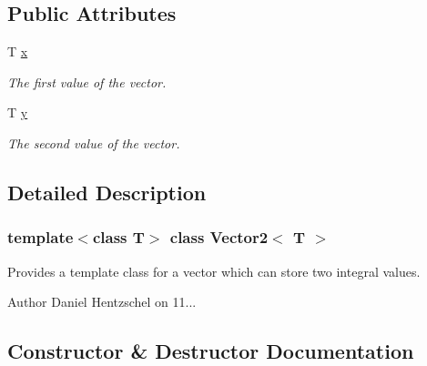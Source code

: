 \subsection*{Public Attributes}
\begin{DoxyCompactItemize}
\item 
\mbox{\label{class_vector2_a78fa1f2ed5e261c7fbeb8f3536a1ee34}} 
T \mbox{\hyperlink{class_vector2_a78fa1f2ed5e261c7fbeb8f3536a1ee34}{x}}
\begin{DoxyCompactList}\small\item\em The first value of the vector. \end{DoxyCompactList}\item 
\mbox{\label{class_vector2_a6cfed8355591aa269f4dba43bd806ef9}} 
T \mbox{\hyperlink{class_vector2_a6cfed8355591aa269f4dba43bd806ef9}{y}}
\begin{DoxyCompactList}\small\item\em The second value of the vector. \end{DoxyCompactList}\end{DoxyCompactItemize}


\subsection{Detailed Description}
\subsubsection*{template$<$class T$>$\newline
class Vector2$<$ T $>$}

Provides a template class for a vector which can store two integral values. 

\begin{DoxyAuthor}{Author}
Daniel Hentzschel on 11... 
\end{DoxyAuthor}


\subsection{Constructor \& Destructor Documentation}
\mbox{\label{class_vector2_afa4bd612e378da7ce0e367179d923301}} 
